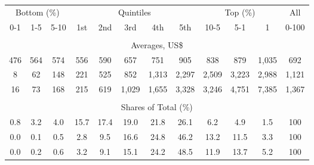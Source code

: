 \begin{tabular}{c c c| c c c c c| c c c| c}
\toprule
\multicolumn{3}{c|}{Bottom (\%)} & \multicolumn{5}{c|}{Quintiles} & \multicolumn{3}{c|}{Top (\%)} & All  \\
0-1 & 1-5 & 5-10 &  1st & 2nd & 3rd & 4th & 5th & 10-5 & 5-1 & 1 & 0-100 \\
\midrule \\
\multicolumn{12}{c}{Averages, US\$} \\
\midrule
476  & 564  & 574  & 556  & 590  & 657  & 751  & 905  & 838  & 879  & 1,035  & 692 \\
8 & 62 & 148 & 221 & 525 & 852 & 1,313 & 2,297 & 2,509 & 3,223 & 2,988 & 1,121 \\
16 & 73 & 168 & 215 & 619 & 1,029 & 1,655 & 3,328 & 3,246 & 4,751 & 7,385 & 1,367 \\
\midrule \\
\multicolumn{12}{c}{Shares of Total (\%)} \\
\midrule
0.8   & 3.2   & 4.0   & 15.7   & 17.4   & 19.0   & 21.8   & 26.1   & 6.2   & 4.9   & 1.5   & 100 \\
0.0  & 0.1  & 0.5  & 2.8  & 9.5  & 16.6  & 24.8  & 46.2  & 13.2  & 11.5  & 3.3  & 100 \\
0.0  & 0.2  & 0.6  & 3.2  & 9.1  & 15.1  & 24.2  & 48.5  & 11.9  & 13.7  & 5.2  & 100 \\
\bottomrule
\end{tabular}